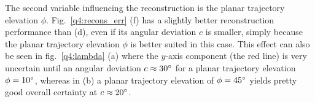 \documentclass{report}
\begin{document}
The second variable influencing the reconstruction is the planar trajectory elevation $\phi$. Fig.~\ref{q4:recons_err} (f) has a slightly better reconstruction performance than (d), even if its angular deviation $c$ is smaller, simply because the planar trajectory elevation $\phi$ is better suited in this case. This effect can also be seen in fig.~\ref{q4:lambda} (a) where the $y$-axis component (the red line) is very uncertain until an angular deviation $c \approx 30\degree$ for a planar trajectory elevation $\phi = 10\degree$, whereas in (b) a planar trajectory elevation of $\phi = 45\degree$ yields pretty good overall certainty at $c \approx 20\degree$.

\end{document}
